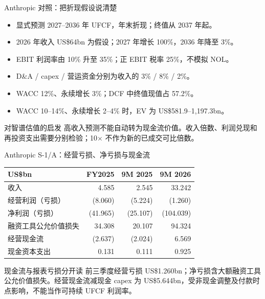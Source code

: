 \documentclass[aspectratio=169,11pt]{beamer}
\newcommand{\smallnote}[1]{\vspace{0.2em}{\footnotesize #1}}
\begin{document}
\begin{frame}{Anthropic 对照：把折现假设说清楚}
  \begin{itemize}
    \item 显式预测 2027--2036 年 UFCF，年末折现；终值从 2037 年起。
    \item 2026 年收入 US\$64bn 为假设；2027 年增长 100\%，2036 年降至 3\%。
    \item EBIT 利润率由 10\% 升至 35\%；正 EBIT 税率 25\%，不模拟 NOL。
    \item D\&A / capex / 营运资金分别为收入的 3\% / 8\% / 2\%。
    \item WACC 12\%、永续增长 3\%；DCF 中终值现值占 57.2\%。
    \item WACC 10--14\%、永续增长 2--4\% 时，EV 为 US\$581.9--1,197.3bn。
  \end{itemize}
  \begin{block}{对智谱估值的启发}
    高收入预测不能自动转为现金流价值。收入倍数、利润兑现和再投资支出需要分别检验；10$\times$ 不作为新的已成交可比倍数。
  \end{block}
\end{frame}

\begin{frame}{Anthropic S-1/A：经营亏损、净亏损与现金流}
  \centering\small
  \begin{tabular}{lrrr}
    \toprule
    US\$bn & FY2025 & 9M 2025 & 9M 2026\\
    \midrule
    收入 & 4.585 & 2.545 & 33.242\\
    经营利润（亏损） & (8.060) & (5.224) & (1.260)\\
    净利润（亏损） & (41.965) & (25.107) & (104.039)\\
    融资工具公允价值损失 & 34.308 & 20.107 & 94.324\\
    经营现金流 & (2.637) & (2.024) & 6.569\\
    现金资本支出 & 0.131 & 0.111 & 0.925\\
    \bottomrule
  \end{tabular}
  \begin{block}{现金流与报表亏损分开读}
    前三季度经营亏损 US\$1.260bn；净亏损含大额融资工具公允价值损失。经营现金流减现金 capex 为 US\$5.644bn，受非现金调整及付款时点影响，不能当作可持续 UFCF 利润率。
  \end{block}
  \smallnote{11/2 S-1/A 财务报表及 MD\&A。FY2025 经审计；九个月数据未经审计。}
\end{frame}
\end{document}

